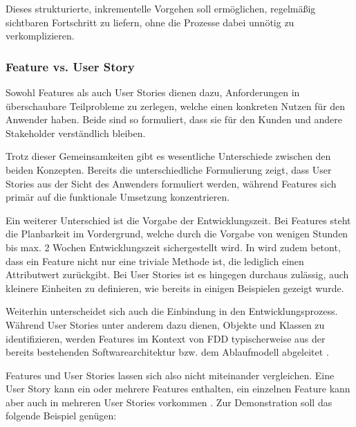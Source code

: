 \documentclass[acmtog]{acmart}
\begin{document}
Dieses strukturierte, inkrementelle Vorgehen soll ermöglichen, regelmäßig sichtbaren Fortschritt zu liefern, ohne die Prozesse dabei unnötig zu verkomplizieren.

\subsubsection{Feature vs. User Story}

Sowohl Features als auch User Stories dienen dazu, Anforderungen in überschaubare Teilprobleme zu zerlegen, welche einen konkreten Nutzen für den Anwender haben. Beide sind so formuliert, dass sie für den Kunden und andere Stakeholder verständlich bleiben.

Trotz dieser Gemeinsamkeiten gibt es wesentliche Unterschiede zwischen den beiden Konzepten.
Bereits die unterschiedliche Formulierung zeigt, dass User Stories aus der Sicht des Anwenders formuliert werden, während Features sich primär auf die funktionale Umsetzung konzentrieren.

Ein weiterer Unterschied ist die Vorgabe der Entwicklungszeit.
Bei Features steht die Planbarkeit im Vordergrund, welche durch die Vorgabe von wenigen Stunden bis max. 2 Wochen Entwicklungszeit sichergestellt wird.
In \cite{palmer02} wird zudem betont, dass ein Feature nicht nur eine triviale Methode ist, die lediglich einen Attributwert zurückgibt.
Bei User Stories ist es hingegen durchaus zulässig, auch kleinere Einheiten zu definieren, wie bereits in einigen Beispielen gezeigt wurde.

Weiterhin unterscheidet sich auch die Einbindung in den Entwicklungsprozess.
Während User Stories unter anderem dazu dienen, Objekte und Klassen zu identifizieren, werden Features im Kontext von FDD typischerweise aus der bereits bestehenden Softwarearchitektur bzw. dem Ablaufmodell abgeleitet \cite{palmer02}.

Features und User Stories lassen sich also nicht miteinander vergleichen. Eine User Story kann ein oder mehrere Features enthalten, ein einzelnen Feature kann aber auch in mehreren User Stories vorkommen \cite{palmer02}. Zur Demonstration soll das folgende Beispiel genügen:\smallskip
\end{document}
